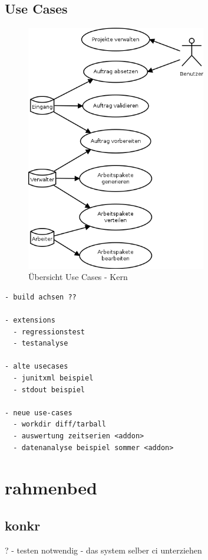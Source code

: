 \subsection{Use Cases}



\begin{figure}[ht]
  \label{fig:use-case-muss}
  \begin{center}
      \includegraphics[width=0.7\textwidth]{imageinput/use-case-muss.png}
  \end{center}
  \caption{\"Ubersicht Use Cases - Kern}
\end{figure}


\begin{verbatim}
- build achsen ??

- extensions
  - regressionstest
  - testanalyse

- alte usecases
  - junitxml beispiel
  - stdout beispiel

- neue use-cases
  - workdir diff/tarball
  - auswertung zeitserien <addon>
  - datenanalyse beispiel sommer <addon>
\end{verbatim}


\section{rahmenbed}

\subsection{konkr}?
- testen notwendig
- das system selber ci unterziehen

